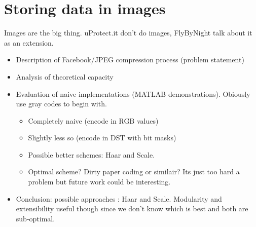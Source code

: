 \section{Storing data in images}
    Images are the big thing. uProtect.it don't do images, FlyByNight talk about it as an extension.
    \begin{itemize}
	\item Description of Facebook/JPEG compression process (problem statement)
	\item Analysis of theoretical capacity
	\item Evaluation of naive implementations (MATLAB demonstrations). Obiously use gray codes to begin with.
            \begin{itemize}
		\item Completely naive (encode in RGB values)
		\item Slightly less so (encode in DST with bit masks)
                \item Possible better schemes: Haar and Scale.
                \item Optimal scheme? Dirty paper coding or similair? Its just too hard a problem but future work could be interesting.
             \end{itemize}
	\item Conclusion: possible approaches : Haar and Scale. Modularity and extensibility useful though since we don't know which is best and both are sub-optimal.
    \end{itemize}
    
